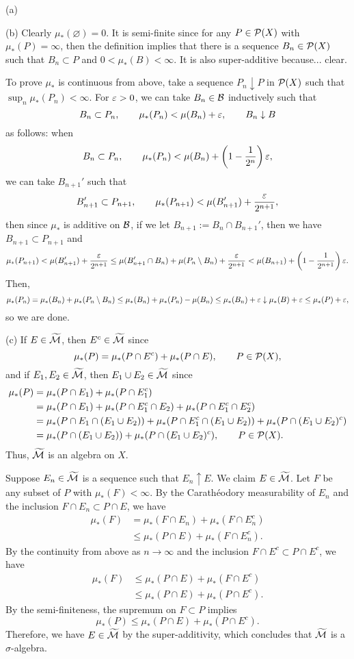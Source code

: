 \documentclass{../../large}
\begin{document}
\begin{pf}
(a)

(b)
Clearly $\mu_*(\varnothing)=0$.
It is semi-finite since for any $P\in\mathcal{P}(X)$ with $\mu_*(P)=\infty$, then the definition implies that there is a sequence $B_n\in\mathcal{P}(X)$ such that $B_n\subset P$ and $0<\mu_*(B)<\infty$.
It is also super-additive because... clear.

To prove $\mu_*$ is continuous from above, take a sequence $P_n\downarrow P$ in $\mathcal{P}(X)$ such that $\sup_n\mu_*(P_n)<\infty$.
For $\varepsilon>0$, we can take $B_n\in\mathcal{B}$ inductively such that
\[B_n\subset P_n,\qquad \mu_*(P_n)<\mu(B_n)+\varepsilon,\qquad B_n\downarrow B\]
as follows: when
\[B_n\subset P_n,\qquad \mu_*(P_n)<\mu(B_n)+\left(1-\frac1{2^n}\right)\varepsilon,\]
we can take $B_{n+1}'$ such that 
\[B_{n+1}'\subset P_{n+1},\qquad \mu_*(P_{n+1})<\mu(B_{n+1}')+\frac{\varepsilon}{2^{n+1}},\]
then since $\mu_*$ is additive on $\mathcal{B}$, if we let $B_{n+1}:=B_n\cap B_{n+1}'$, then we have $B_{n+1}\subset P_{n+1}$ and
\[\mu_*(P_{n+1})<\mu(B_{n+1}')+\frac{\varepsilon}{2^{n+1}}\le\mu(B_{n+1}'\cap B_n)+\mu(P_n\setminus B_n)+\frac{\varepsilon}{2^{n+1}}<\mu(B_{n+1})+\left(1-\frac1{2^{n+1}}\right)\varepsilon.\]
Then,
\[\mu_*(P_n)=\mu_*(B_n)+\mu_*(P_n\setminus B_n)\le\mu_*(B_n)+\mu_*(P_n)-\mu(B_n)\le\mu_*(B_n)+\varepsilon\downarrow\mu_*(B)+\varepsilon\le\mu_*(P)+\varepsilon,\]
so we are done.

(c)
If $E\in\widetilde{\mathcal{M}}$, then $E^c\in\widetilde{\mathcal{M}}$ since
\[\mu_*(P)=\mu_*(P\cap E^c)+\mu_*(P\cap E),\qquad P\in\mathcal{P}(X),\]
and if $E_1,E_2\in\widetilde{\mathcal{M}}$, then $E_1\cup E_2\in\widetilde{\mathcal{M}}$ since
\begin{align*}
\mu_*(P)
&=\mu_*(P\cap E_1)+\mu_*(P\cap E_1^c)\\
&=\mu_*(P\cap E_1)+\mu_*(P\cap E_1^c\cap E_2)+\mu_*(P\cap E_1^c\cap E_2^c)\\
&=\mu_*(P\cap E_1\cap(E_1\cup E_2))+\mu_*(P\cap E_1^c\cap(E_1\cup E_2))+\mu_*(P\cap(E_1\cup E_2)^c)\\
&=\mu_*(P\cap(E_1\cup E_2))+\mu_*(P\cap(E_1\cup E_2)^c),\qquad P\in\mathcal{P}(X).
\end{align*}
Thus, $\widetilde{\mathcal{M}}$ is an algebra on $X$.

Suppose $E_n\in\widetilde{\mathcal{M}}$ is a sequence such that $E_n\uparrow E$.
We claim $E\in\widetilde{\mathcal{M}}$.
Let $F$ be any subset of $P$ with $\mu_*(F)<\infty$.
By the Carath\'eodory measurability of $E_n$ and the inclusion $F\cap E_n\subset P\cap E$, we have
\begin{align*}
\mu_*(F)
&=\mu_*(F\cap E_n)+\mu_*(F\cap E_n^c)\\
&\le\mu_*(P\cap E)+\mu_*(F\cap E_n^c).
\end{align*}
By the continuity from above as $n\to\infty$ and the inclusion $F\cap E^c\subset P\cap E^c$, we have
\begin{align*}
\mu_*(F)
&\le\mu_*(P\cap E)+\mu_*(F\cap E^c)\\
&\le\mu_*(P\cap E)+\mu_*(P\cap E^c).
\end{align*}
By the semi-finiteness, the supremum on $F\subset P$ implies
\[\mu_*(P)\le\mu_*(P\cap E)+\mu_*(P\cap E^c).\]
Therefore, we have $E\in\widetilde{\mathcal{M}}$ by the super-additivity, which concludes that $\widetilde{\mathcal{M}}$ is a $\sigma$-algebra.



\end{pf}
\end{document}
